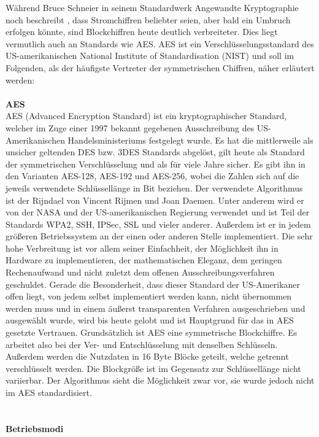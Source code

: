 \documentclass[13pt,a4paper,bibliography=totocnumbered,listof=totocnumbered]{scrartcl}
\begin{document}
Während Bruce Schneier in seinem Standardwerk Angewandte Kryptographie noch beschreibt \cite[S. 249]{42}, dass Stromchiffren beliebter seien, aber bald ein Umbruch erfolgen könnte, sind Blockchiffren heute deutlich verbreiteter. Dies liegt vermutlich auch an Standards wie AES. AES ist ein Verschlüsselungsstandard des US-amerikanischen National Institute of Standardisation (NIST) und soll im Folgenden, als der häufigste Vertreter der symmetrischen Chiffren, näher erläutert werden:\\
\\\textbf{AES}\\
AES (Advanced Encryption Standard) ist ein kryptographischer Standard, welcher im Zuge einer 1997 bekannt gegebenen Ausschreibung des US-Amerikanischen Handelsministeriums festgelegt wurde. Es hat die mittlerweile als unsicher geltenden DES bzw. 3DES Standards abgelöst, gilt heute als Standard der symmetrischen Verschlüsselung und als für viele Jahre sicher. Es gibt ihn in den Varianten AES-128, AES-192 und AES-256, wobei die Zahlen sich auf die jeweils verwendete Schlüssellänge in Bit beziehen. Der verwendete Algorithmus ist der Rijndael von Vincent Rijmen und Joan Daemen. Unter anderem wird er von der NASA und der US-amerikanischen Regierung verwendet und ist Teil der Standards WPA2, SSH, IPSec, SSL und vieler anderer. Außerdem ist er in jedem größeren Betriebssystem an der einen oder anderen Stelle implementiert. Die sehr hohe Verbreitung ist vor allem seiner Einfachheit, der Möglichkeit ihn in Hardware zu implementieren, der mathematischen Eleganz, dem geringen Rechenaufwand und nicht zuletzt dem offenen Ausschreibungsverfahren geschuldet. Gerade die Besonderheit, dass dieser Standard der US-Amerikaner offen liegt, von jedem selbst implementiert werden kann, nicht übernommen werden muss und in einem äußerst transparenten Verfahren ausgeschrieben und ausgewählt wurde, wird bis heute gelobt und ist Hauptgrund für das in AES gesetzte Vertrauen. Grundsätzlich ist AES eine symmetrische Blockchiffre. Es arbeitet also bei der Ver- und Entschlüsselung mit denselben Schlüsseln. Außerdem werden die Nutzdaten in 16 Byte Blöcke geteilt, welche getrennt verschlüsselt werden. Die Blockgröße ist im Gegensatz zur Schlüssellänge nicht variierbar. Der Algorithmus sieht die Möglichkeit zwar vor, sie wurde jedoch nicht im AES standardisiert.\\
\cite{5} \cite[S. 7ff ]{4}\\
\\\textbf{Betriebsmodi}\\
\end{document}
